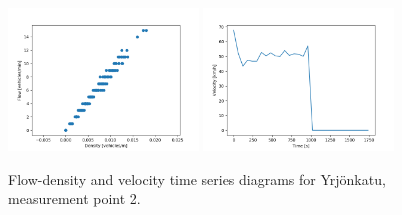 \documentclass[english, 12pt, a4paper, elec, utf8, pdfa, online]{aaltothesis}
\begin{document}
\begin{figure}[ht!]
    \centering
    \includegraphics[width=0.45\textwidth]{graphs/Yrjonkatu_2_flw_dns.png}
    \includegraphics[width=0.45\textwidth]{graphs/Yrjonkatu_2_spd_time_6.png}
    \caption{Flow-density and velocity time series diagrams for Yrjönkatu, measurement point 2.}
\end{figure}

\clearpage
\end{document}
